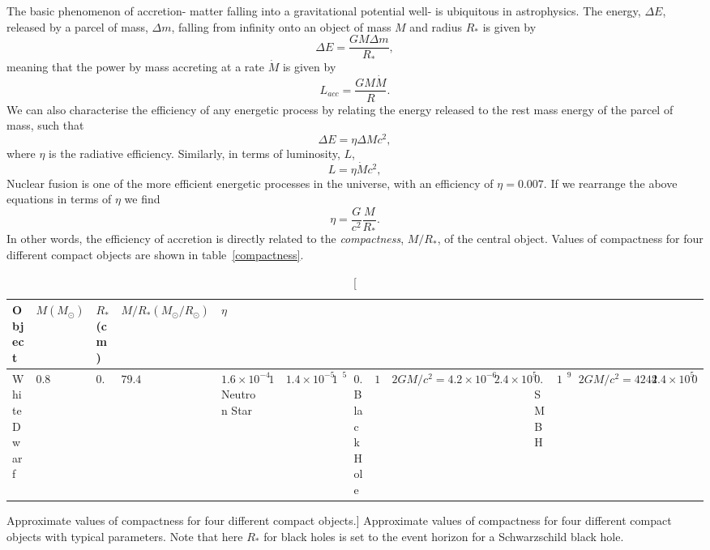 The basic phenomenon of accretion- matter falling into a gravitational potential well- 
is ubiquitous in astrophysics. The energy, $\Delta E$, released by a parcel of 
mass, $\Delta m$, falling from infinity onto an object of mass $M$ and radius $R_*$
is given by
\begin{equation}
\Delta E = \frac{GM \Delta m}{R_*},
\label{eq:acc_energy}
\end{equation} 
meaning that the power by mass accreting at a rate $\dot{M}$ is given by
\begin{equation}
L_{acc} = \frac{GM \dot{M}}{R}.
\label{eq:acc_energy}
\end{equation} 
We can also characterise the efficiency of any energetic process by relating
the energy released to the rest mass energy of the parcel of mass, such that
\begin{equation}
\Delta E = \eta \Delta M c^2,
\label{eq:restmass}
\end{equation} 
where $\eta$ is the radiative efficiency. Similarly, in terms of luminosity, $L$,
\begin{equation}
L = \eta \dot{M} c^2,
\label{eq:restmass2}
\end{equation} 
Nuclear fusion is one of the more efficient
energetic processes in the universe, with an efficiency of
$\eta=0.007$. If we rearrange the above equations in terms of $\eta$ we find
\begin{equation}
\eta = \frac{G}{c^2} \frac{M}{R_*}.
\label{eq:eta}
\end{equation} 
In other words, the efficiency of accretion is directly related 
to the {\em compactness}, $M/R_*$, of the central object. 
Values of compactness for four different compact objects
are shown in table~\ref{compactness}. 

\begin{table}
\centering
\begin{tabular}{p{2cm}p{2cm}p{2cm}p{2cm}p{2cm}}
\hline Object & $M (M_\odot)$ & $R_*$ (cm) & $M/R_* (M_\odot / R_\odot)$ & $\eta$\\ 
\hline \hline 
White Dwarf & $0.8$ & $0.01$ & $79.4$ & $1.6\times10^{-4}$
Neutron Star & $1.4$ & $1.4\times10^{-5}$ & $10^5$ & $0.2$
Black Hole & $10$ & $2GM/c^2 = 4.2\times10^{-6}$ & $2.4\times10^5$ & $0.48$
SMBH & $10^9$ & $2GM/c^2 = 4244$ & $2.4\times10^5$ & $0.48$
\end{tabular}
\centering
\caption
[Approximate values of compactness for four different compact objects.]
{
Approximate values of compactness for four different compact objects with typical
parameters. Note that here $R_*$ for black holes is set to the event horizon
for a Schwarzschild black hole.
}
\label{compact}
\end{table}

